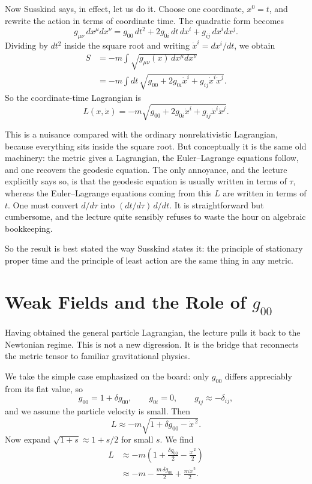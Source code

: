 Now Susskind says, in effect, let us do it. Choose one coordinate, \(x^0=t\), and rewrite the action in terms of coordinate time. The quadratic form becomes
\begin{equation}
g_{\mu\nu}\,dx^\mu dx^\nu
=
g_{00}\,dt^2+2g_{0i}\,dt\,dx^i+g_{ij}\,dx^i dx^j.
\end{equation}
Dividing by \(dt^2\) inside the square root and writing \(\dot x^i = dx^i/dt\), we obtain
\begin{align}
S
&=
-m\int \sqrt{g_{\mu\nu}(x)\,dx^\mu dx^\nu}
\\
&=
-m\int dt\,
\sqrt{g_{00}+2g_{0i}\dot x^i+g_{ij}\dot x^i\dot x^j}.
\end{align}
So the coordinate-time Lagrangian is
\begin{equation}
L(x,\dot x)
=
-m\sqrt{g_{00}+2g_{0i}\dot x^i+g_{ij}\dot x^i\dot x^j}.
\end{equation}

This is a nuisance compared with the ordinary nonrelativistic Lagrangian, because everything sits inside the square root. But conceptually it is the same old machinery: the metric gives a Lagrangian, the Euler--Lagrange equations follow, and one recovers the geodesic equation. The only annoyance, and the lecture explicitly says so, is that the geodesic equation is usually written in terms of \(\tau\), whereas the Euler--Lagrange equations coming from this \(L\) are written in terms of \(t\). One must convert \(d/d\tau\) into \((dt/d\tau)\,d/dt\). It is straightforward but cumbersome, and the lecture quite sensibly refuses to waste the hour on algebraic bookkeeping.

So the result is best stated the way Susskind states it: the principle of stationary proper time and the principle of least action are the same thing in any metric.

\section{Weak Fields and the Role of \texorpdfstring{$g_{00}$}{g00}}

Having obtained the general particle Lagrangian, the lecture pulls it back to the Newtonian regime. This is not a new digression. It is the bridge that reconnects the metric tensor to familiar gravitational physics.

We take the simple case emphasized on the board: only \(g_{00}\) differs appreciably from its flat value, so
\begin{equation}
g_{00}=1+\delta g_{00},
\qquad
g_{0i}=0,
\qquad
g_{ij}\approx -\delta_{ij},
\end{equation}
and we assume the particle velocity is small. Then
\begin{equation}
L \approx -m\sqrt{1+\delta g_{00}-\dot x^{\,2}}.
\end{equation}
Now expand \(\sqrt{1+s}\approx 1+s/2\) for small \(s\). We find
\begin{align}
L
&\approx
-m\left(1+\frac{\delta g_{00}}{2}-\frac{\dot x^{\,2}}{2}\right)
\\
&\approx
-m-\frac{m\,\delta g_{00}}{2}+\frac{m\dot x^{\,2}}{2}.
\end{align}

